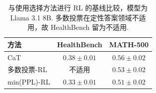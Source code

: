 \begin{longtable}{lcc}
\caption{与使用选择方法进行 RL 的基线比较，模型为 Llama 3.1 8B. 多数投票在定性答案领域不适用，故 HealthBench 留为不适用.}\label{cat-tab:rlbaselines}\\

\toprule
方法 & HealthBench & MATH-500 \\
\midrule
CaT & $\mathbf{0.38} \pm 0.01$  & $\mathbf{0.56} \pm 0.02$ \\
多数投票-RL & 不适用 & $0.53 \pm 0.02$ \\
min(PPL)-RL & $0.33 \pm 0.01$ & $0.51 \pm 0.02$ \\
\bottomrule

\end{longtable}
